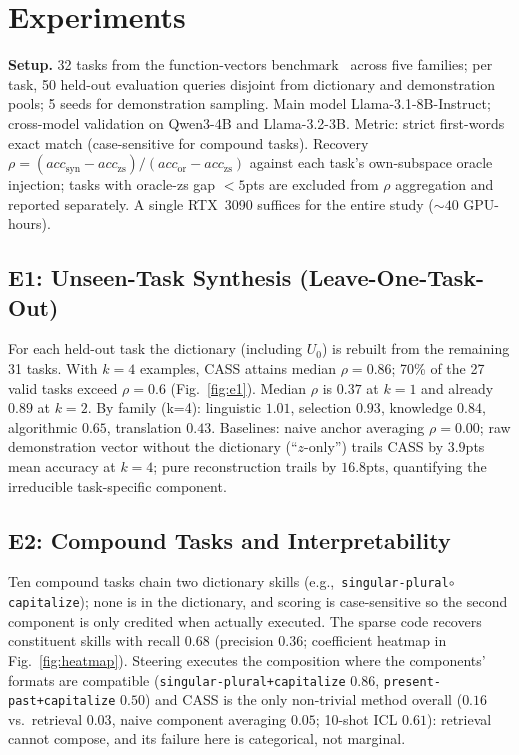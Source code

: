 \documentclass[sigconf,review,anonymous]{acmart}
\newcommand{\method}{\textsc{CASS}}
\newcommand{\eg}{e.g.,}
\begin{document}
\section{Experiments}
\label{sec:exp}
\textbf{Setup.} 32 tasks from the function-vectors
benchmark~\cite{todd2024function} across five families; per task, 50 held-out
evaluation queries disjoint from dictionary and demonstration pools; 5 seeds
for demonstration sampling. Main model Llama-3.1-8B-Instruct; cross-model
validation on Qwen3-4B and Llama-3.2-3B. Metric: strict first-words exact
match (case-sensitive for compound tasks). Recovery
$\rho=(acc_{\text{syn}}-acc_{\text{zs}})/(acc_{\text{or}}-acc_{\text{zs}})$
against each task's own-subspace oracle injection; tasks with oracle-zs gap
$<5$pts are excluded from $\rho$ aggregation and reported separately. A
single RTX~3090 suffices for the entire study (${\sim}40$ GPU-hours).

\subsection{E1: Unseen-Task Synthesis (Leave-One-Task-Out)}
\label{sec:e1}
For each held-out task the dictionary (including $U_0$) is rebuilt from the
remaining 31 tasks. With $k{=}4$ examples, \method{} attains median
$\rho=\mathbf{0.86}$; 70\% of the 27 valid tasks exceed $\rho{=}0.6$
(Fig.~\ref{fig:e1}). Median $\rho$ is $0.37$ at $k{=}1$ and already $0.89$ at
$k{=}2$. By family (k=4): linguistic $1.01$, selection $0.93$, knowledge
$0.84$, algorithmic $0.65$, translation $0.43$. Baselines: naive anchor
averaging $\rho=0.00$; raw demonstration vector without the dictionary
(``$z$-only'') trails \method{} by $3.9$pts mean accuracy at $k{=}4$; pure
reconstruction trails by $16.8$pts, quantifying the irreducible task-specific
component.

\subsection{E2: Compound Tasks and Interpretability}
Ten compound tasks chain two dictionary skills (\eg\
\texttt{singular-plural}$\circ$\texttt{capitalize}); none is in the
dictionary, and scoring is case-sensitive so the second component is only
credited when actually executed. The sparse code recovers constituent skills
with recall $0.68$ (precision $0.36$; coefficient heatmap in
Fig.~\ref{fig:heatmap}). Steering executes the composition where the
components' formats are compatible (\texttt{singular-plural+capitalize}
$0.86$, \texttt{present-past+capitalize} $0.50$) and \method{} is the only
non-trivial method overall ($0.16$ vs.\ retrieval $0.03$, naive component
averaging $0.05$; 10-shot ICL $0.61$): retrieval cannot compose, and its
failure here is categorical, not marginal.
\end{document}
